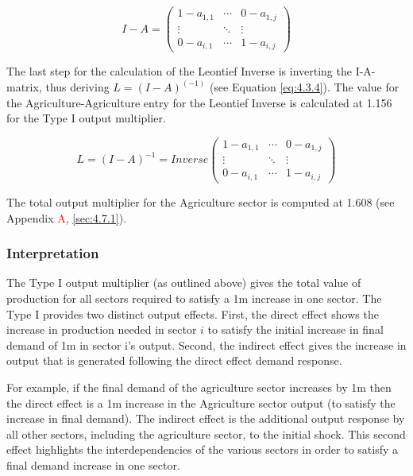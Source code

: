 \begin{doublespacing}
  \begin{singlespacing} \begin{equation} \label{eq:4.3.3}
  I-A = \begin{pmatrix}
  1-a_{1,1} & \cdots & 0-a_{1,j} \\
  \vdots & \ddots & \vdots  \\
  0-a_{i,1} & \cdots & 1-a_{i,j}
   \end{pmatrix}   \end{equation} \end{singlespacing}  \bigskip

The last step for the calculation of the Leontief Inverse is inverting the I-A-matrix, thus deriving  $L=(I-A)^{(-1)}$ (see Equation \ref{eq:4.3.4}). The value for the Agriculture-Agriculture entry for the Leontief Inverse is calculated at 1.156 for the Type I output multiplier.

  \bigskip   \begin{singlespacing}  \begin{equation} \label{eq:4.3.4}
  L=(I-A)^{-1} = Inverse  \begin{pmatrix}
    1-a_{1,1} & \cdots & 0-a_{1,j} \\
    \vdots & \ddots & \vdots  \\
    0-a_{i,1} & \cdots & 1-a_{i,j}
  \end{pmatrix}  \end{equation} \end{singlespacing}  \bigskip

The total output multiplier for the Agriculture sector is computed at 1.608 (see Appendix \textcolor{red}A, \ref{sec:4.7.1}).

\subsubsection{Interpretation}

The Type I output multiplier (as outlined above) gives the total value of production for all sectors required to satisfy a \textsterling1m increase in one sector. The Type I provides two distinct output effects. First, the direct effect shows the increase in production needed in sector $i$ to satisfy the initial increase in final demand of \textsterling1m in sector i's output. Second, the indirect effect gives the increase in output that is generated following the direct effect demand response.

\bigskip

For example, if the final demand of the agriculture sector increases by \textsterling1m then the direct effect is a \textsterling1m increase in the Agriculture sector output (to satisfy the increase in final demand). The indirect effect is the additional output response by all other sectors, including the agriculture sector, to the initial shock. This second effect highlights the interdependencies of the various sectors in order to satisfy a final demand increase in one sector.


\end{doublespacing}
